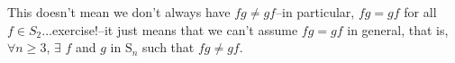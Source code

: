 \documentclass[11pt,dvipsnames]{book}
\numberwithin{equation}{section} %
\numberwithin{figure}{section} %
\numberwithin{table}{section} %
\begin{document}
This doesn't mean we don't always have $fg\neq gf$--in particular, $fg=gf$ for all $f\in S_{2}$...exercise!--it just means that we can't assume $fg=gf$ in general, that is, $\forall n\geqslant 3$,  $\exists$ $f$ and $g$ in $\mathrm{S}_n$  such that  $fg\ne gf$. 

%
%
%
%
%
%
%
%
%
%
\end{document}
